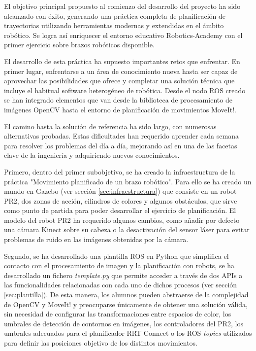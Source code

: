 \documentclass[12pt,spanish,chapterprefix, numbers=noenddot]{book}
\numberwithin{equation}{section}
\numberwithin{figure}{section}
\begin{document}
El objetivo principal propuesto al comienzo del desarrollo del proyecto ha sido alcanzado con éxito, generando una práctica completa de planificación de trayectorias utilizando herramientas modernas y extendidas en el ámbito robótico. Se logra así enriquecer el entorno educativo Robotics-Academy con el primer ejercicio sobre brazos robóticos disponible. 

El desarrollo de esta práctica ha supuesto importantes retos que enfrentar. En primer lugar, enfrentarse a un área de conocimiento nueva hasta ser capaz de aprovechar las posibilidades que ofrece y completar una solución técnica que incluye el habitual software heterogéneo de robótica. Desde el nodo ROS creado se han integrado elementos que van desde la biblioteca de procesamiento de imágenes OpenCV hasta el entorno de planificación de movimientos MoveIt!.

El camino hasta la solución de referencia ha sido largo, con numerosas alternativas probadas. Estas dificultades han requerido aprender cada semana para resolver los problemas del día a día, mejorando así en una de las facetas clave de la ingeniería y adquiriendo nuevos conocimientos.

Primero, dentro del primer subobjetivo, se ha creado la infraestructura de la práctica "Movimiento planificado de un brazo robótico". Para ello se ha creado un mundo en Gazebo (ver sección \ref{sec:infraestructura}) que consiste en un robot PR2, dos zonas de acción, cilindros de colores y algunos obstáculos, que sirve como punto de partida para poder desarrollar el ejercicio de planificación. El modelo del robot PR2 ha requerido algunos cambios, como añadir por defecto una cámara Kinect sobre su cabeza o la desactivación del sensor láser para evitar problemas de ruido en las imágenes obtenidas por la cámara. 

Segundo, se ha desarrollado una plantilla ROS en Python que simplifica el contacto con el procesamiento de imagen y la planificación con robots, se ha desarrollado un fichero \textit{template.py} que permite acceder a través de dos APIs a las funcionalidades relacionadas con cada uno de dichos procesos (ver sección \ref{sec:plantilla}). De esta manera, los alumnos pueden abstraerse de la complejidad de OpenCV y MoveIt! y preocuparse únicamente de obtener una solución válida, sin necesidad de configurar las transformaciones entre espacios de color, los umbrales de detección de contornos en imágenes, los controladores del PR2, los umbrales adecuados para el planificador RRT Connect o los ROS \textit{topics} utilizados para definir las posiciones objetivo de los distintos movimientos.
\end{document}
